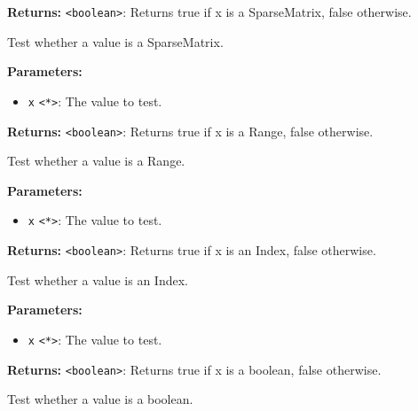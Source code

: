 \documentclass[12pt,a4paper]{article}
\begin{document}
\noindent \textbf{Returns:} \texttt{<boolean>}: Returns true if \textasciigrave{}x\textasciigrave{} is a SparseMatrix, false otherwise.

\noindent Test whether a value is a SparseMatrix.

\vspace{5mm}
\noindent {}


\noindent \textbf{Parameters:}
\begin{itemize}
  \item \texttt{x} \texttt{<*>}: The value to test.
\end{itemize}

\noindent \textbf{Returns:} \texttt{<boolean>}: Returns true if \textasciigrave{}x\textasciigrave{} is a Range, false otherwise.

\noindent Test whether a value is a Range.

\vspace{5mm}
\noindent {}


\noindent \textbf{Parameters:}
\begin{itemize}
  \item \texttt{x} \texttt{<*>}: The value to test.
\end{itemize}

\noindent \textbf{Returns:} \texttt{<boolean>}: Returns true if \textasciigrave{}x\textasciigrave{} is an Index, false otherwise.

\noindent Test whether a value is an Index.

\vspace{5mm}
\noindent {}


\noindent \textbf{Parameters:}
\begin{itemize}
  \item \texttt{x} \texttt{<*>}: The value to test.
\end{itemize}

\noindent \textbf{Returns:} \texttt{<boolean>}: Returns true if \textasciigrave{}x\textasciigrave{} is a boolean, false otherwise.

\noindent Test whether a value is a boolean.
\end{document}
